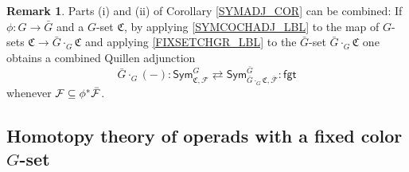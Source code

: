\documentclass[a4paper,10pt
,draft
]{article}%
\numberwithin{equation}{section}
\numberwithin{figure}{section}
\theoremstyle{definition} %
\newtheorem{remark}[equation]{Remark}%
\newcommand{\F}{\ensuremath{\mathcal F}}
\newcommand{\1}{\ensuremath{\mathbbm 1}}%
\begin{document}







\begin{remark}\label{COMBADJ REM}
      Parts (i) and (ii) of Corollary \ref{SYMADJ_COR} can be combined: %
      If $\phi \colon G \to \bar{G}$ and a $G$-set $\mathfrak{C}$,
      by applying \ref{SYMCOCHADJ_LBL} to the map of $G$-sets $\mathfrak{C} \to \bar{G} \cdot_G \mathfrak{C}$
      and applying \ref{FIXSETCHGR_LBL} to the $\bar{G}$-set $\bar{G} \cdot_G \mathfrak{C}$
      one obtains a combined Quillen adjunction
      \[
	\bar{G} \cdot_G (-) \colon \mathsf{Sym}^G_{\mathfrak{C},\F}
	\rightleftarrows
	\mathsf{Sym}^{\bar{G}}_{\bar{G} \cdot_G \mathfrak{C},\bar{\F}} \colon \mathsf{fgt}
\]
whenever $\F \subseteq \phi^{\**} \bar{\F}$.
\end{remark}

 
\subsection{Homotopy theory of operads with a fixed color $G$-set}
\label{OPC_MS_SEC}
\end{document}
